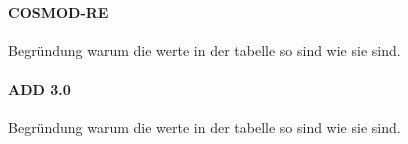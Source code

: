\paragraph{COSMOD-RE}
Begründung warum die werte in der tabelle so sind wie sie sind. \\

\paragraph{ADD 3.0}
Begründung warum die werte in der tabelle so sind wie sie sind. \\
